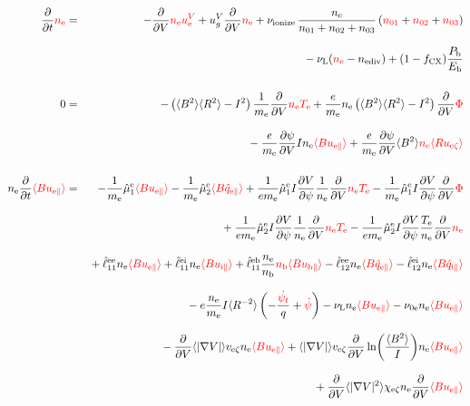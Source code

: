\documentclass[11pt]{article}
\def\r#1{{\rm#1}}
\def\aves#1{\langle#1\rangle}
\def\dd#1#2{\frac{\partial #1}{\partial #2}}
\def\para{\parallel}
\def\ddV{\frac{\partial}{\partial V}}
\def\psid{\dot{\psi}}
\def\psit{\psi_t}
\def\psitd{\dot{\psit}}
\def\me{m_\r{e}}
\def\nee{n_\r{e}}
\def\nb{n_\r{b}}
\def\nna{n_{01}}
\def\nnb{n_{02}}
\def\nnc{n_{03}}
\def\Te{T_\r{e}}
\def\Pb{P_\r{b}}
\def\Eb{E_\r{b}}
\def\uezt{u_{\r{e}\zeta}}
\def\uepara{u_{\r{e}\para}}
\def\uipara{u_{\r{i}\para}}
\def\ubpara{u_{\r{b}\para}}
\def\qhatepara{\hat{q}_{\r{e}\para}}
\def\qhatipara{\hat{q}_{\r{i}\para}}
\def\ueV{u_\r{e}^V}
\def\ugV{u_{g}^V}
\def\bri{\aves{B^2}\aves{R^2} - I^2}
\def\ddt{\frac{\partial}{\partial t}}
\def\fCX{f_\r{CX}}
\def\nune{\nu_\r{0e}}
\def\nuL{\nu_\r{L}}
\def\nuion{\nu_\r{ionize}}
\def\nediv{n_\r{ediv}}
\def\red#1{\textcolor{red}{#1}}
\begin{document}
%
\begin{eqnarray}
  \ddt \red{\nee}  &=&
%
  - \ddV \red{\nee\ueV}
%
  + \ugV \ddV \red{\nee}
%
  + \nuion\, \frac{\nee}{\nna + \nnb + \nnc}\, (\red{\nna} + \red{\nnb}
  + \red{\nnc})
\nonumber\\[3mm]&&{}
%
  - \nuL (\red{\nee} - \nediv)
%
  + (1 - \fCX) \frac{\Pb}{\Eb}
\\[5mm]
  0 &=&
%
  -        \left( \bri \right) \frac{1}{\me} \ddV \red{\nee \Te}
%
  + \frac{e}{\me} \nee \left( \bri \right) \ddV \red{\Phi}
\nonumber\\[3mm]&&{}
%
  - \frac{e}{\me} \dd{\psi}{V} I \nee \red{\aves{B\uepara}}
%
  + \frac{e}{\me} \dd{\psi}{V} \aves{B^2} \red{\nee \aves{R\uezt}}
\\[5mm]
  \nee \ddt \red{\aves{B \uepara}} &=&
%
  - \frac{1}{\me} \hat{\mu}_1^\r{e} \red{\aves{B \uepara}}
  - \frac{1}{\me} \hat{\mu}_2^\r{e} \red{\aves{B \qhatepara}}
%
  + \frac{1}{e\me} \hat{\mu}_1^\r{e} I \dd{V}{\psi} \frac{1}{\nee} \ddV
  \red{\nee \Te}
  - \frac{1}{\me} \hat{\mu}_1^\r{e} I \dd{V}{\psi} \ddV \red{\Phi}
\nonumber\\[3mm]&&{}
%
  + \frac{1}{e\me} \hat{\mu}_2^\r{e} I \dd{V}{\psi} \frac{1}{\nee} \ddV
  \red{\nee \Te}
  - \frac{1}{e\me} \hat{\mu}_2^\r{e} I \dd{V}{\psi} \frac{\Te}{\nee} \ddV
  \red{\nee}
\nonumber\\[3mm]&&{}
%
  + \hat{\ell}_{11}^{\r{ee}} \nee \red{\aves{B \uepara}}
  + \hat{\ell}_{11}^{\r{ei}} \nee \red{\aves{B \uipara}}
  + \hat{\ell}_{11}^{\r{eb}} \frac{\nee}{\nb} \red{\nb \aves{B \ubpara}}
%
  - \hat{\ell}_{12}^{\r{ee}} \nee \red{\aves{B \qhatepara}}
  - \hat{\ell}_{12}^{\r{ei}} \nee \red{\aves{B \qhatipara}}
\nonumber\\[3mm]&&{}
%
  - e \frac{\nee}{\me} I \aves{R^{-2}} \left( - \frac{\red{\psitd}}{q} + \red{\psid} \right)
%
%
  - \nuL \nee \red{\aves{B \uepara}}
%
  - \nune \nee \red{\aves{B \uepara}}
\nonumber\\[3mm]&&{}
%
  - \ddV \aves{|\nabla V|} v_{\r{e}\zeta} \nee \red{\aves{B \uepara}}
%
  + \aves{|\nabla V|} v_{\r{e}\zeta} \ddV \ln
  \biggl(\frac{\aves{B^2}}{I}\biggl) \nee \red{\aves{B \uepara}}
\nonumber\\[3mm]&&{}
%
  + \ddV \aves{|\nabla V|^2} \chi_{\r{e}\zeta} \nee \ddV \red{\aves{B
  \uepara}}

\end{eqnarray}
\end{document}
